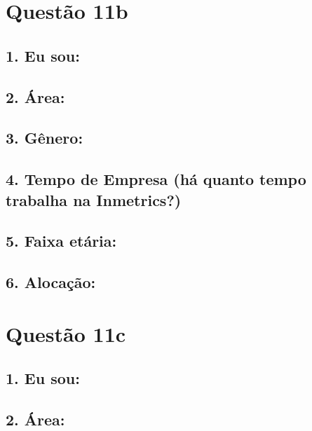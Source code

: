 \documentclass[]{book}
\begin{document}
\hypertarget{questao-11b}{%
\section{Questão 11b}\label{questao-11b}}

\hypertarget{eu-sou-13}{%
\subsection{1. Eu sou:}\label{eu-sou-13}}

\hypertarget{area-13}{%
\subsection{2. Área:}\label{area-13}}

\hypertarget{genero-13}{%
\subsection{3. Gênero:}\label{genero-13}}

\hypertarget{tempo-de-empresa-ha-quanto-tempo-trabalha-na-inmetrics-13}{%
\subsection{4. Tempo de Empresa (há quanto tempo trabalha na Inmetrics?)}\label{tempo-de-empresa-ha-quanto-tempo-trabalha-na-inmetrics-13}}

\hypertarget{faixa-etaria-13}{%
\subsection{5. Faixa etária:}\label{faixa-etaria-13}}

\hypertarget{alocacao-13}{%
\subsection{6. Alocação:}\label{alocacao-13}}

\hypertarget{questao-11c}{%
\section{Questão 11c}\label{questao-11c}}

\hypertarget{eu-sou-14}{%
\subsection{1. Eu sou:}\label{eu-sou-14}}

\hypertarget{area-14}{%
\subsection{2. Área:}\label{area-14}}
\end{document}
